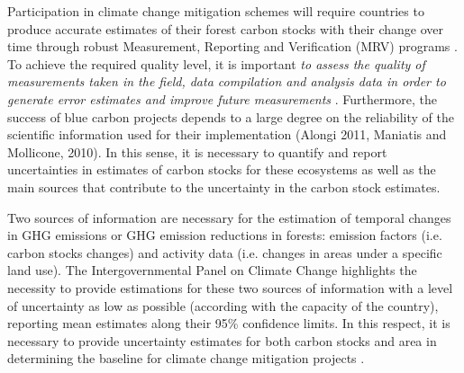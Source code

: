 \documentclass[review, authoryear]{elsarticle}   	%
\begin{document}
Participation in climate change mitigation schemes will require countries to produce accurate estimates of their forest carbon stocks with their change over time through robust Measurement, Reporting and Verification (MRV) programs \citep{Cohen2013968}. To achieve the required quality level, it is important \emph{to assess the quality of measurements taken in the field, data compilation and analysis data in order to generate error estimates and improve future measurements} \citep{Maniatis2010}. Furthermore, the success of blue carbon projects depends to a large degree on the reliability of the scientific information used for their implementation (Alongi 2011, Maniatis and Mollicone, 2010). In this sense, it is necessary to quantify and report uncertainties in estimates of carbon stocks for these ecosystems \citep{Kauffman2012, Alongi2011} as well as the main sources that contribute to the uncertainty in the carbon stock estimates. 


Two sources of information are necessary for the estimation of temporal changes in GHG emissions or GHG emission reductions in forests: emission factors (i.e. carbon stocks changes) and activity data (i.e. changes in areas under a specific land use). The Intergovernmental Panel on Climate Change \citep{IPCC2003, IPCC2006} highlights the necessity to provide estimations for these two sources of information with a level of uncertainty as low as possible (according with the capacity of the country), reporting mean estimates along their 95\% confidence limits. In this respect, it is necessary to provide uncertainty estimates for both carbon stocks and area in determining the baseline for climate change mitigation projects \citep{Maniatis2010}. 

\end{document}
